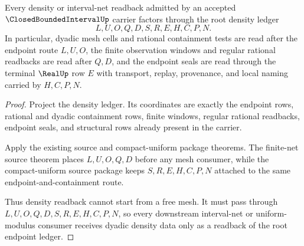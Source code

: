 \begin{theorem}
\label{thm:closed-bounded-interval-density-readback}
Every density or interval-net readback admitted by an accepted $\ClosedBoundedIntervalUp$ carrier factors through the root density ledger
$$
L,U,O,Q,D,S,R,E,H,C,P,N .
$$
In particular, dyadic mesh cells and rational containment tests are read after the endpoint route $L,U,O$, the finite observation windows and regular rational readbacks are read after $Q,D$, and the endpoint seals are read through the terminal $\RealUp$ row $E$ with transport, replay, provenance, and local naming carried by $H,C,P,N$.
\end{theorem}
\begin{proof}
Project the density ledger. Its coordinates are exactly the endpoint rows, rational and dyadic containment rows, finite windows, regular rational readbacks, endpoint seals, and structural rows already present in the carrier.

Apply the existing source and compact-uniform package theorems. The finite-net source theorem places $L,U,O,Q,D$ before any mesh consumer, while the compact-uniform source package keeps $S,R,E,H,C,P,N$ attached to the same endpoint-and-containment route.

Thus density readback cannot start from a free mesh. It must pass through $L,U,O,Q,D,S,R,E,H,C,P,N$, so every downstream interval-net or uniform-modulus consumer receives dyadic density data only as a readback of the root endpoint ledger.
\end{proof}

